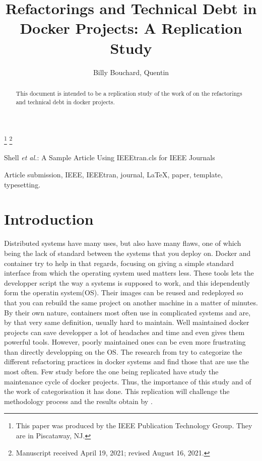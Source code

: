 \documentclass[lettersize,journal]{IEEEtran}
\begin{document}
\title{Refactorings and Technical Debt in Docker Projects: A Replication Study}

\author{Billy Bouchard, Quentin }
\thanks{This paper was produced by the IEEE Publication Technology Group. They are in Piscataway, NJ.}%
\thanks{Manuscript received April 19, 2021; revised August 16, 2021.}

%
{Shell \MakeLowercase{\textit{et al.}}: A Sample Article Using IEEEtran.cls for IEEE Journals}

\maketitle

\begin{abstract}
This document is intended to be a replication study of the work of \cite{1} on the refactorings and technical debt in docker projects.
\end{abstract}

\begin{IEEEkeywords}
Article submission, IEEE, IEEEtran, journal, \LaTeX, paper, template, typesetting.
\end{IEEEkeywords}

\section{Introduction}
Distributed systems have many uses, but also have many flaws, one of which being the lack of standard between the systems that you deploy on.
Docker and container try to help in that regards, focusing on giving a simple standard interface from which the operating system used matters less.
These tools lets the developper script the way a systems is supposed to work, and this idependently form the operatin system(OS).
Their images can be reused and redeployed so that you can rebuild the same project on another machine in a matter of minutes.
By their own nature, containers most often use in complicated systems and are, by that very same definition, usually hard to maintain.
Well maintained docker projects can save developper a lot of headaches and time and even gives them powerful tools.
However, poorly maintained ones can be even more frustrating than directly developping on the OS.
The research from \cite{1} try to categorize the different refactoring practices in docker systems and find those that are use the most often.
Few study before the one being replicated have study the maintenance cycle of docker projects.
Thus, the importance of this study and of the work of categorisation it has done.
This replication will challenge the methodology process and the results obtain by \cite{1}.
\end{document}
